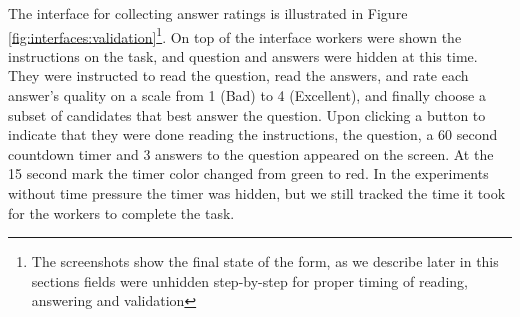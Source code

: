 \documentclass[11pt,letterpaper]{article}
\begin{document}
The interface for collecting answer ratings is illustrated in Figure \ref{fig:interfaces:validation}\footnote{The screenshots show the final state of the form, as we describe later in this sections fields were unhidden step-by-step for proper timing of reading, answering and validation}.
On top of the interface workers were shown the instructions on the task, and question and answers were hidden at this time.
They were instructed to read the question, read the answers, and rate each answer's quality on a scale from 1 (Bad) to 4 (Excellent), and finally choose a subset of candidates that best answer the question.
Upon clicking a button to indicate that they were done reading the instructions, the question, a 60 second countdown timer and 3 answers to the question appeared on the screen.
At the 15 second mark the timer color changed from green to red.
In the experiments without time pressure the timer was hidden, but we still tracked the time it took for the workers to complete the task.
\end{document}
